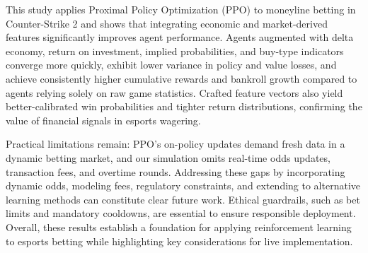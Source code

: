 \documentclass[sigconf]{acmart}
\begin{document}
This study applies Proximal Policy Optimization (PPO) to moneyline betting in Counter-Strike 2 and shows that integrating economic and market-derived features significantly improves agent performance. Agents augmented with delta economy, return on investment, implied probabilities, and buy-type indicators converge more quickly, exhibit lower variance in policy and value losses, and achieve consistently higher cumulative rewards and bankroll growth compared to agents relying solely on raw game statistics. Crafted feature vectors also yield better-calibrated win probabilities and tighter return distributions, confirming the value of financial signals in esports wagering.

Practical limitations remain: PPO’s on-policy updates demand fresh data in a dynamic betting market, and our simulation omits real-time odds updates, transaction fees, and overtime rounds. Addressing these gaps by incorporating dynamic odds, modeling fees, regulatory constraints, and extending to alternative learning methods can constitute clear future work. Ethical guardrails, such as bet limits and mandatory cooldowns, are essential to ensure responsible deployment. Overall, these results establish a foundation for applying reinforcement learning to esports betting while highlighting key considerations for live implementation.




\end{document}
